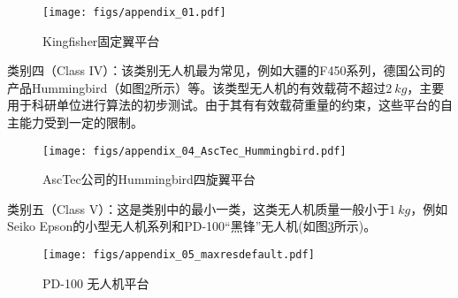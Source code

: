 \begin{figure}[htb]   
	\centering
	\texttt{[image: figs/appendix\_01.pdf]}
	\caption{Kingfisher固定翼平台}
	\label{fig:appendix_01}
\end{figure}

类别四（Class IV）：该类别无人机最为常见，例如大疆的F450系列，德国公司的产品Hummingbird（如图\ref{fig:appendix_04_AscTec_Hummingbird}所示）等。该类型无人机的有效载荷不超过$2\ kg$，主要用于科研单位进行算法的初步测试。由于其有有效载荷重量的约束，这些平台的自主能力受到一定的限制。
\begin{figure}[htb]   
	\centering
	\texttt{[image: figs/appendix\_04\_AscTec\_Hummingbird.pdf]}
	\caption{AscTec公司的Hummingbird四旋翼平台}
	\label{fig:appendix_04_AscTec_Hummingbird}
\end{figure}


类别五（Class V）：这是类别中的最小一类，这类无人机质量一般小于$1\ kg$，例如Seiko Epson的小型无人机系列和PD-100“黑锋”无人机(如图\ref{fig:appendix_05_maxresdefault}所示)。
\begin{figure}[htb]   
	\centering
	\texttt{[image: figs/appendix\_05\_maxresdefault.pdf]}
	\caption{PD-100 无人机平台}
	\label{fig:appendix_05_maxresdefault}
\end{figure}


